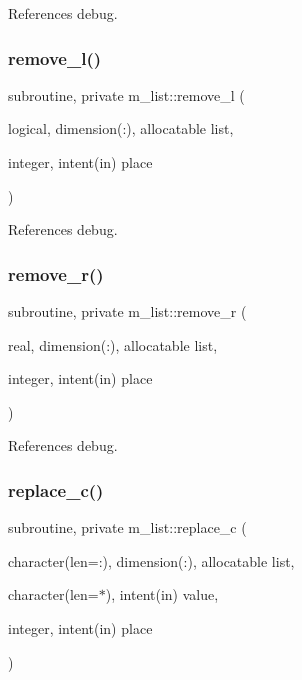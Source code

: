 References debug.

\mbox{\label{namespacem__list_a138b6450613db943177df6258f58e89b}} 
\subsubsection{\texorpdfstring{remove\+\_\+l()}{remove\_l()}}
{\footnotesize\ttfamily subroutine, private m\+\_\+list\+::remove\+\_\+l (\begin{DoxyParamCaption}\item[{logical, dimension(\+:), allocatable}]{list,  }\item[{integer, intent(in)}]{place }\end{DoxyParamCaption})\hspace{0.3cm}{\ttfamily [private]}}



References debug.

\mbox{\label{namespacem__list_af5940ed6b39d9e3429e2784767db9e56}} 
\subsubsection{\texorpdfstring{remove\+\_\+r()}{remove\_r()}}
{\footnotesize\ttfamily subroutine, private m\+\_\+list\+::remove\+\_\+r (\begin{DoxyParamCaption}\item[{real, dimension(\+:), allocatable}]{list,  }\item[{integer, intent(in)}]{place }\end{DoxyParamCaption})\hspace{0.3cm}{\ttfamily [private]}}



References debug.

\mbox{\label{namespacem__list_adddd2b7443557b3727320c314170e001}} 
\subsubsection{\texorpdfstring{replace\+\_\+c()}{replace\_c()}}
{\footnotesize\ttfamily subroutine, private m\+\_\+list\+::replace\+\_\+c (\begin{DoxyParamCaption}\item[{character(len=\+:), dimension(\+:), allocatable}]{list,  }\item[{character(len=$\ast$), intent(in)}]{value,  }\item[{integer, intent(in)}]{place }\end{DoxyParamCaption})\hspace{0.3cm}{\ttfamily [private]}}



